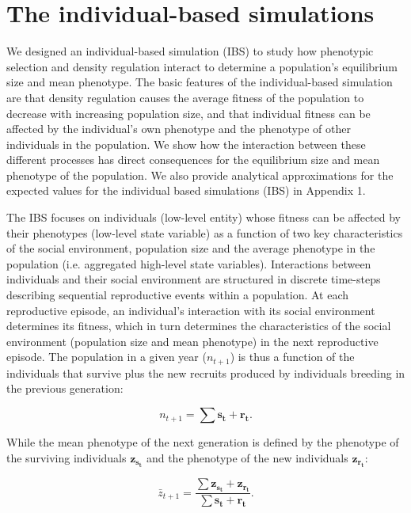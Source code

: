 \documentclass{article}
\begin{document}
	\section{The individual-based simulations}
	We designed an individual-based simulation (IBS) to study how phenotypic selection and density regulation interact to determine a population's equilibrium size and mean phenotype. The basic features of the individual-based simulation are that density regulation causes the average fitness of the population to decrease with increasing population size, and that individual fitness can be affected by the individual's own phenotype and the phenotype of other individuals in the population. We show how the interaction between these different processes has direct consequences for the equilibrium size and mean phenotype of the population. We also provide analytical approximations for the expected values for the individual based simulations (IBS) in Appendix 1. 
	
	The IBS focuses on individuals (low-level entity) whose fitness can be affected by their phenotypes (low-level state variable) as a function of two key characteristics of the social environment, population size and the average phenotype in the population (i.e. aggregated high-level state variables). Interactions between individuals and their social environment are structured in discrete time-steps describing sequential reproductive events within a population. At each reproductive episode, an individual's interaction with its social environment determines its fitness, which in turn determines the characteristics of the social environment (population size and mean phenotype) in the next reproductive episode. The population in a given year ($n_{t+1}$) is thus a function of the individuals that survive plus the new recruits produced by individuals breeding in the previous generation: 
	
	\begin{equation} \label{eq: N_t}
	n_{t+1}=\sum \bm{s_{t}} + \bm{r_{t}}.
	\end{equation}
	
	\noindent While the mean phenotype of the next generation is defined by the phenotype of the surviving individuals $\bm{z_{s_t}}$ and the phenotype of the new individuals  $\bm{z_{r_t}}$:
	
	\begin{equation} \label{eq: z_t}
	\bar{z}_{t+1}=\frac{\sum \bm{z_{s_t}} + \bm{z_{r_t}}}{\sum \bm{s_{t}} + \bm{r_{t}}}.
	\end{equation}
	
\end{document}

